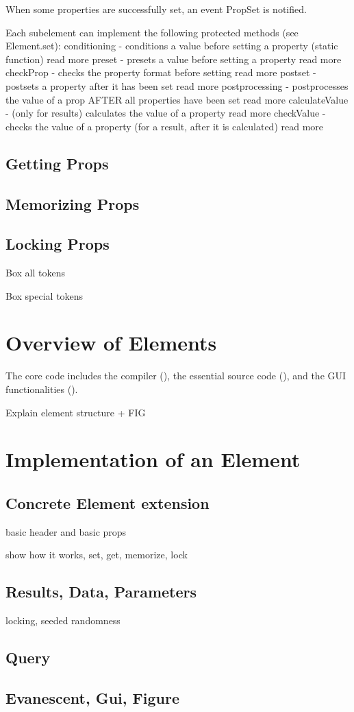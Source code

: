 \documentclass{tufte-handout}
\begin{document}
  When some properties are successfully set, an event PropSet is notified.

 Each subelement can implement the following protected methods (see Element.set):
    conditioning   - conditions a value before setting a property (static function) read more 
    preset         - presets a value before setting a property read more 
    checkProp      - checks the property format before setting read more 
    postset        - postsets a property after it has been set read more 
    postprocessing - postprocesses the value of a prop 
                     AFTER all properties have been set read more 
    calculateValue - (only for results) calculates the value of a property read more 
    checkValue     - checks the value of a property 
                     (for a result, after it is calculated) read more

\subsection{Getting Props}  

\subsection{Memorizing Props}  
  
\subsection{Locking Props}  

Box all tokens 

Box special tokens 

\section{Overview of Elements}

The core code includes the compiler (), the essential source code (), and the GUI functionalities (). 

Explain element structure + FIG

\section{Implementation of an Element}

\subsection{Concrete Element extension}

basic header and basic props

show how it works, set, get, memorize, lock

\subsection{Results, Data, Parameters}

locking, seeded randomness

\subsection{Query}

\subsection{Evanescent, Gui, Figure}

%
%
\end{document}
